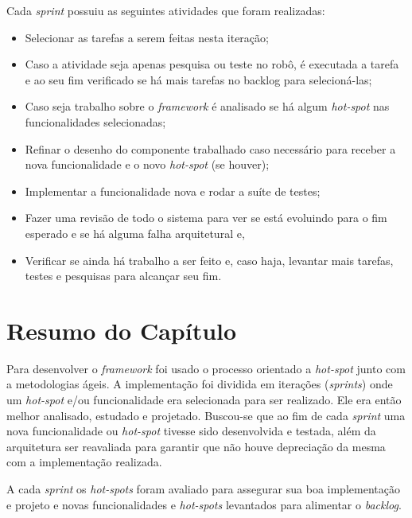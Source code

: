 Cada \textit{sprint} possuiu as seguintes atividades que foram realizadas: 
\begin{itemize}
  \item Selecionar as tarefas a serem feitas nesta iteração;
  \item Caso a atividade seja apenas pesquisa ou teste no robô, é executada a tarefa e ao seu fim verificado se há mais tarefas no backlog para selecioná-las;
  \item Caso seja trabalho sobre o \textit{framework} é analisado se há algum \textit{hot-spot} nas funcionalidades selecionadas;
  \item Refinar o desenho do componente trabalhado caso necessário para receber a nova funcionalidade e o novo \textit{hot-spot} (se houver);
  \item Implementar a funcionalidade nova e rodar a suíte de testes;
  \item Fazer uma revisão de todo o sistema para ver se está evoluindo para o fim esperado e se há alguma falha arquitetural e,
  \item Verificar se ainda há trabalho a ser feito e, caso haja, levantar mais tarefas, testes e pesquisas para alcançar seu fim.
\end{itemize} 

\section{Resumo do Capítulo}

Para desenvolver o \textit{framework} foi usado o processo orientado a \textit{hot-spot} junto com a metodologias ágeis. A implementação foi dividida em iterações (\textit{sprints}) onde um \textit{hot-spot} e/ou funcionalidade era selecionada para ser realizado. Ele era então melhor analisado, estudado e projetado. Buscou-se que ao fim de cada \textit{sprint} uma nova funcionalidade ou \textit{hot-spot} tivesse sido desenvolvida e testada, além da arquitetura ser reavaliada para garantir que não houve depreciação da mesma com a implementação realizada.

A cada \textit{sprint} os \textit{hot-spots} foram avaliado para assegurar sua boa implementação e projeto e novas funcionalidades e \textit{hot-spots} levantados para alimentar o \textit{backlog}.